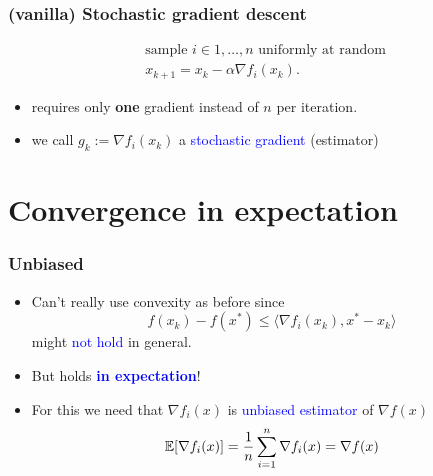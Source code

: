\documentclass{beamer}
\begin{document}
\begin{frame}
  \frametitle{(vanilla) Stochastic gradient descent}

  \begin{block}{}
    \begin{align}
      &\text{sample $i\in 1,\dots, n$ uniformly at random} \\
      &x_{k+1} = x_k - \alpha \nabla f_i(x_k).
    \end{align}
  \end{block}

  \begin{itemize}
    \item requires only \textbf{one} gradient instead of $n$ per iteration.
    \item we call $g_k := \nabla f_i(x_k)$ a \textcolor{blue}{stochastic gradient} (estimator)
  \end{itemize}
\end{frame}


\section{Convergence in expectation}%
\label{sec:}

\begin{frame}
  \frametitle{Unbiased}
  \begin{itemize}
    \item Can't really use convexity as before since
          \begin{equation}
            f(x_k)-f(x^*) \le \langle \nabla f_i(x_k), x^*-x_k \rangle
          \end{equation}
          might \textcolor{blue}{not hold} in general.
    \item But holds \textcolor{blue}{\textbf{in expectation}}!
    \item For this we need that $\nabla f_i(x)$ is \textcolor{blue}{unbiased estimator} of $\nabla f(x)$
  \begin{equation}
    \mathbb{E} [\nabla f_i(x)] = \frac{1}{n} \sum_{i=1}^{n} \nabla f_i(x) = \nabla f(x)
  \end{equation}
  \end{itemize}
\end{frame}
\end{document}
